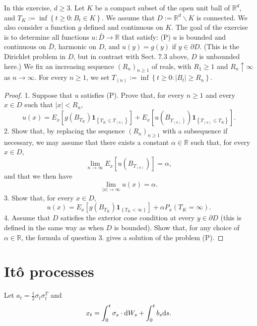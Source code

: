 \documentclass[twoside, 12pt]{book}
\numberwithin{equation}{chapter}
\def\geq{\geqslant}
\def\leq{\leqslant}
\def\d{\text{\rm{d}}}
\begin{document}
	In this exercise, $d \geq 3$. Let $K$ be a compact subset of the open unit ball of $\mathbb{R}^d$, and $T_K:=\inf \left\{t \geq 0: B_t \in K\right\}$. We assume that $D:=\mathbb{R}^d \backslash K$ is connected. We also consider a function $g$ defined and continuous on $K$. The goal of the exercise is to determine all functions $u: \bar{D} \rightarrow \mathbb{R}$ that satisfy:
	(P) $u$ is bounded and continuous on $\bar{D}$, harmonic on $D$, and $u(y)=g(y)$ if $y \in \partial D$.
	(This is the Dirichlet problem in $D$, but in contrast with Sect. 7.3 above, $D$ is unbounded here.) We fix an increasing sequence $\left(R_n\right)_{n \geq 1}$ of reals, with $R_1 \geq 1$ and $R_n \uparrow \infty$ as $n \rightarrow \infty$. For every $n \geq 1$, we set $T_{(n)}:=\inf \left\{t \geq 0:\left|B_t\right| \geq R_n\right\}$.
	
	\begin{proof}
		1. Suppose that $u$ satisfies (P). Prove that, for every $n \geq 1$ and every $x \in D$ such that $|x|<R_n$,
		$$
		u(x)=E_x\left[g\left(B_{T_K}\right) \mathbf{1}_{\left\{T_K \leq T_{(n)}\right\}}\right]+E_x\left[u\left(B_{\left.T_{(n)}\right)}\right) \mathbf{1}_{\left\{T_{(n)} \leq T_K\right\}}\right] .
		$$
		2. Show that, by replacing the sequence $\left(R_n\right)_{n \geq 1}$ with a subsequence if necessary, we may assume that there exists a constant $\alpha \in \mathbb{R}$ such that, for every $x \in D$,
		$$
		\lim _{n \rightarrow \infty} E_x\left[u\left(B_{T_{(n)}}\right)\right]=\alpha,
		$$
		and that we then have
		$$
		\lim _{|x| \rightarrow \infty} u(x)=\alpha .
		$$
		3. Show that, for every $x \in D$,
		$$
		u(x)=E_x\left[g\left(B_{T_K}\right) \mathbf{1}_{\left\{T_K<\infty\right\}}\right]+\alpha P_x\left(T_K=\infty\right) .
		$$
		4. Assume that $D$ satisfies the exterior cone condition at every $y \in \partial D$ (this is defined in the same way as when $D$ is bounded). Show that, for any choice of $\alpha \in \mathbb{R}$, the formula of question 3. gives a solution of the problem (P).
	\end{proof}
	
	
	\chapter{It\^o processes}\label{chapt:Ito}
	Let $a_t=\frac{1}{2} \sigma_t\sigma_t^{T}$ and 
	\begin{equation}\label{eq:Ito-process}
		x_t= \int_0^t \sigma_s \cdot \d W_s+\int_0^t b_s \d s . 
	\end{equation}
	
\end{document}
